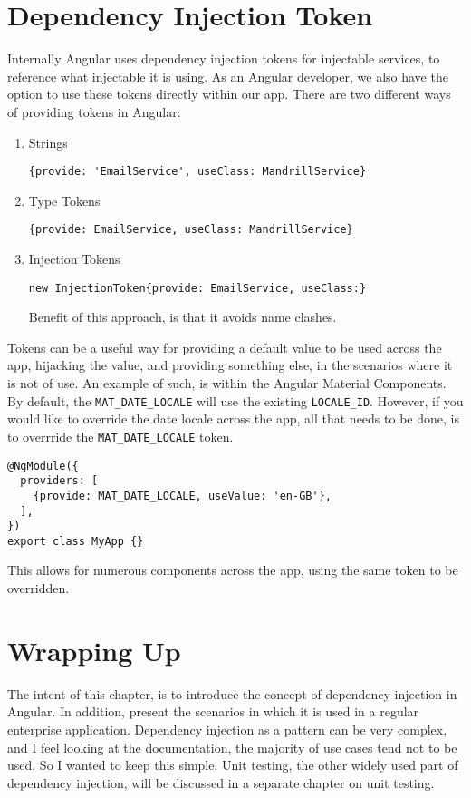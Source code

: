\section{ Dependency Injection Token }
Internally Angular uses dependency injection tokens for injectable services, to
reference what injectable it is using. As an Angular developer, we also have the 
option to use these tokens directly within our app. There are two different 
ways of providing tokens in Angular:
\begin{enumerate}
  \item Strings 
\begin{lstlisting}  
{provide: 'EmailService', useClass: MandrillService}
\end{lstlisting}  
  \item Type Tokens
\begin{lstlisting}    
{provide: EmailService, useClass: MandrillService}
\end{lstlisting}  
  \item Injection Tokens
\begin{lstlisting}   
new InjectionToken{provide: EmailService, useClass:} 
\end{lstlisting}   
Benefit of this approach, is that it avoids name clashes.
\end{enumerate}

Tokens can be a useful way for providing a default value to be used across the 
app, hijacking the value, and providing something else, in the 
scenarios where it is not of use. An example of such, is within the Angular 
Material Components. By default, the \lstinline{MAT_DATE_LOCALE} will use 
the existing \lstinline{LOCALE_ID}. However, if you would like to override the 
date locale across the app, all that needs to be done, is to overrride the 
\lstinline{MAT_DATE_LOCALE} token. 
\begin{lstlisting}
@NgModule({
  providers: [
    {provide: MAT_DATE_LOCALE, useValue: 'en-GB'},
  ],
})
export class MyApp {}
\end{lstlisting}

This allows for numerous components across the app, using the same token to 
be overridden. 

\section{Wrapping Up}
The intent of this chapter, is to introduce the concept of dependency injection 
in Angular. In addition, present the scenarios in which it is used in a regular 
enterprise application. Dependency injection as a pattern can be very complex, 
and I feel looking at the documentation, the majority of use cases tend not 
to be used. So I wanted to keep this simple. Unit testing, the other widely 
used part of dependency injection, will be discussed in a separate chapter on
unit testing. 
